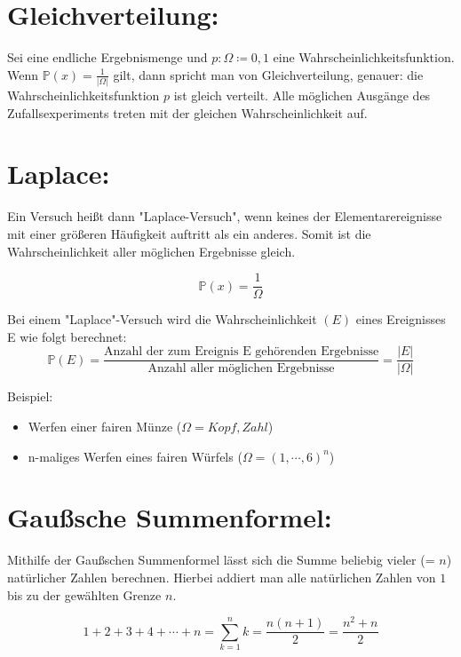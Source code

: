 \documentclass[11pt]{article}
\begin{document}
    \section{Gleichverteilung:}\label{sec:gleichverteilung:}

    Sei \Omega eine endliche Ergebnismenge und \(p : \Omega \coloneqq {0, 1}\) eine Wahrscheinlichkeitsfunktion.
    Wenn \( \mathbb{P}(x) = \frac{1}{|\Omega|}\) gilt, dann spricht man von Gleichverteilung,
    genauer: die Wahrscheinlichkeitsfunktion \(p\) ist gleich verteilt.
    Alle möglichen Ausgänge des Zufallsexperiments treten mit der gleichen Wahrscheinlichkeit auf.


    \section{Laplace:}\label{sec:laplace:}

    Ein Versuch heißt dann "Laplace-Versuch", wenn keines der Elementarereignisse mit einer größeren
    Häufigkeit auftritt als ein anderes.
    Somit ist die Wahrscheinlichkeit aller möglichen Ergebnisse gleich.

    \[\mathbb{P}(x)= \frac{1}{\Omega}\]

    Bei einem "Laplace"-Versuch wird die Wahrscheinlichkeit \((E)\) eines Ereignisses E wie folgt berechnet:
    \[\mathbb{P}(E)= \frac{\text{Anzahl der zum Ereignis E gehörenden Ergebnisse}} {\text{Anzahl aller möglichen Ergebnisse}} = \frac{|E|} {|\Omega|}\]


    Beispiel:
    \begin{itemize}
        \item Werfen einer fairen Münze (\(\Omega= {Kopf, Zahl}\))
    \end{itemize}
    \begin{itemize}
        \item n-maliges Werfen eines fairen Würfels (\(\Omega=({1,\cdots,6}) ^n\))
    \end{itemize}


    \section{Gaußsche Summenformel: }

    Mithilfe der Gaußschen Summenformel lässt sich die Summe beliebig vieler (= \(n\)) natürlicher Zahlen berechnen.
    Hierbei addiert man alle natürlichen Zahlen von \(1\) bis zu der gewählten Grenze \(n\).

    \[1 +2 +3+ 4+ \cdots +n = \sum \limits_{k=1}^{n} k = \frac{n(n+1)}{2} = \frac {n^{2}+n}{2}\]
\end{document}
